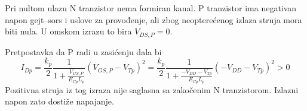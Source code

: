 Pri nultom ulazu N tranzistor nema formiran kanal. P tranzistor ima negativan napon gejt–sors i uslove za provođenje, ali zbog neopterećenog izlaza struja mora biti nula. U omskom izrazu to bira $V_{DS,P}=0$.

Pretpostavka da P radi u zasićenju dala bi
\[I_{Dp}=\frac{k_p}2\frac1{1+\frac{V_{GS,P}}{E_{Cp}L_p}}(V_{GS,P}-V_{Tp})^2=\frac{k_p}2\frac1{1+\frac{-V_{DD}-V_{Tp}}{E_{Cp}L_p}}(-V_{DD}-V_{Tp})^2>0\]
Pozitivna struja iz tog izraza nije saglasna sa zakočenim N tranzistorom. Izlazni napon zato dostiže napajanje.
